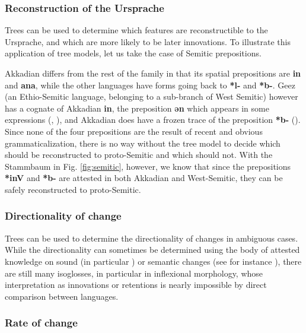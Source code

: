 \documentclass[svgnames,12pt]{scrartcl}
\newcommand{\ipa}[1]{\textbf{{\phon\mbox{#1}}}}
\begin{document}
\subsubsection{Reconstruction of the Ursprache}
Trees can be used to determine which features are reconstructible to the Ursprache, and which are more likely to be later innovations. To illustrate this application of tree models, let us take the case of Semitic  prepositions. 

Akkadian differs from the rest of the family in that its spatial prepositions are \ipa{in} and \ipa{ana}, while the other languages have forms going back to \ipa{*l-} and \ipa{*b-}. Geez (an Ethio-Semitic language, belonging to a sub-branch of West Semitic) however has a cognate of Akkadian \ipa{in}, the preposition \ipa{ən} which appears in some expressions (\citealt[16]{huehnergard06protosemitic}, \citealt[119]{kogan15semitic}), and Akkadian does have a frozen trace of the preposition \ipa{*b-} (\citealt[45-6]{rubin05semitic}). Since none of the four prepositions are the result of recent and obvious grammaticalization, there is no way without the tree model to decide which should be reconstructed to proto-Semitic and which should not. With  the Stammbaum in Fig. \ref{fig:semitic}, however, we know that since the prepositions  \ipa{*inV} and  \ipa{*b-} are attested in both Akkadian and West-Semitic, they can be safely reconstructed to proto-Semitic.

\subsubsection{Directionality of change}
Trees can be used to determine the directionality of changes in ambiguous cases. While the directionality can sometimes be determined using the body of attested knowledge on sound (in particular \citealt{kuemmel07wandel}) or semantic changes (see for instance \citealt{urban11semantic}), there are still many isoglosses, in particular in inflexional morphology, whose interpretation as innovations or retentions is nearly impossible by direct comparison between languages. 

 \subsubsection{Rate of change}
\end{document}
